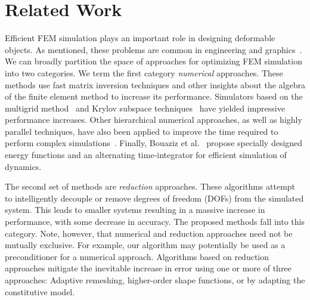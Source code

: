 \section{Related Work}
Efficient FEM simulation plays an important role in designing deformable objects.
As mentioned, these problems are common in engineering and
graphics~\cite{Bendsoe2003,Bickel2010,Kou2012,Skouras2013,Chen2013,Xu2014}.
We can broadly partition the space of approaches for optimizing FEM simulation into two categories.
We term the first category \emph{numerical} approaches.
These methods use fast matrix inversion techniques and other insights about the algebra of the finite element method to increase its performance.
Simulators based on the multigrid method~\cite{Peraire1992,Zhu2010,McAdams2011} and Krylov subspace techniques~\cite{Patterson2012} have yielded impressive performance increases.
Other hierarchical numerical approaches, as well as highly parallel techniques, have also been applied to improve the time required to perform complex simulations~\cite{Farhat1991,Mandel1993}.
Finally, Bouaziz et al.~\cite{Bouaziz:2014} propose specially designed energy functions and an alternating time-integrator for efficient simulation of dynamics.

The second set of methods are \emph{reduction} approaches.
These algorithms attempt to intelligently decouple or remove degrees of freedom (DOFs) from the simulated system.
This leads to smaller systems resulting in a massive increase in performance, with some decrease in accuracy.
The proposed methods fall into this category.
Note, however, that numerical and reduction approaches need not be mutually exclusive.
For example, our algorithm may potentially be used as a preconditioner for a numerical approach. Algorithms based on reduction approaches mitigate the inevitable increase in error using one or more of three approaches: Adaptive remeshing, higher-order shape functions, or by adapting the constitutive model.

